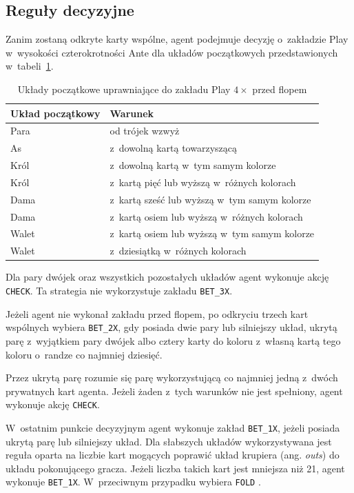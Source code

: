 \subsection{Reguły decyzyjne}
\label{subsec:reguly-decyzyjne-agenta-regulowego}

Zanim zostaną odkryte karty wspólne, agent podejmuje decyzję o~zakładzie Play
w~wysokości czterokrotności Ante dla układów początkowych przedstawionych
w~tabeli~\ref{tab:preflop-raise}.

\begin{table}[h]
    \centering
    \caption{Układy początkowe uprawniające do zakładu Play $4\times$ przed flopem}
    \label{tab:preflop-raise}
    \begin{tabular}{ll}
        \hline
        Układ początkowy & Warunek \\
        \hline
        Para & od trójek wzwyż \\
        As & z~dowolną kartą towarzyszącą \\
        Król & z~dowolną kartą w~tym samym kolorze \\
        Król & z~kartą pięć lub wyższą w~różnych kolorach \\
        Dama & z~kartą sześć lub wyższą w~tym samym kolorze \\
        Dama & z~kartą osiem lub wyższą w~różnych kolorach \\
        Walet & z~kartą osiem lub wyższą w~tym samym kolorze \\
        Walet & z~dziesiątką w~różnych kolorach \\
        \hline
    \end{tabular}
\end{table}

Dla pary dwójek oraz wszystkich pozostałych układów agent wykonuje akcję \texttt{CHECK}.
Ta strategia nie wykorzystuje zakładu
\texttt{BET\_3X}.

Jeżeli agent nie wykonał zakładu przed flopem, po odkryciu trzech
kart wspólnych wybiera \texttt{BET\_2X}, gdy posiada dwie pary
lub silniejszy układ, ukrytą parę z~wyjątkiem pary dwójek albo cztery
karty do koloru z~własną kartą tego koloru o~randze co najmniej
dziesięć.

Przez ukrytą parę rozumie się parę wykorzystującą co najmniej
jedną z~dwóch prywatnych kart agenta. Jeżeli żaden z~tych
warunków nie jest spełniony, agent wykonuje akcję \texttt{CHECK}.

W~ostatnim punkcie decyzyjnym agent wykonuje zakład
\texttt{BET\_1X}, jeżeli posiada ukrytą parę lub silniejszy układ.
Dla słabszych układów wykorzystywana jest reguła oparta na liczbie
kart mogących poprawić układ krupiera (ang. \emph{outs}) do układu pokonującego gracza.
Jeżeli liczba takich kart jest mniejsza niż 21, agent wykonuje
\texttt{BET\_1X}. W~przeciwnym przypadku wybiera \texttt{FOLD}
\cite{wizard_uth}.

